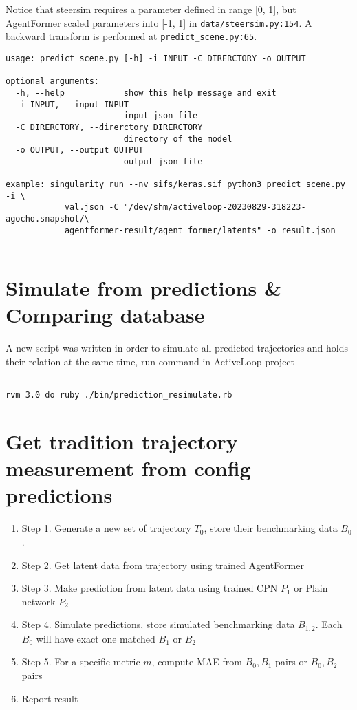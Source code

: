Notice that steersim requires a parameter defined in range [0, 1], but 
AgentFormer scaled parameters into [-1, 1] in \href{ 
https://github.com/hukaidong/MyAgentFormer/blob/e78cd3247d2a2691a5a8ca524b4c7b541fd2f55b/data/steersim.py#L154 
}{\texttt{data/steersim.py:154}}.  A backward transform is performed 
at \texttt{predict_scene.py:65}.

\begin{verbatim}
usage: predict_scene.py [-h] -i INPUT -C DIRERCTORY -o OUTPUT

optional arguments:
  -h, --help            show this help message and exit
  -i INPUT, --input INPUT
                        input json file
  -C DIRERCTORY, --direrctory DIRERCTORY
                        directory of the model
  -o OUTPUT, --output OUTPUT
                        output json file

example: singularity run --nv sifs/keras.sif python3 predict_scene.py -i \
            val.json -C "/dev/shm/activeloop-20230829-318223-agocho.snapshot/\
            agentformer-result/agent_former/latents" -o result.json
  
\end{verbatim}

\section{Simulate from predictions \& Comparing database}

A new script was written in order to simulate all predicted trajectories and 
holds their relation at the same time, run command in ActiveLoop project

\begin{verbatim}

rvm 3.0 do ruby ./bin/prediction_resimulate.rb

\end{verbatim}

\section{Get tradition trajectory measurement from config predictions}
\begin{enumerate}
  \item Step 1. Generate a new set of trajectory $T_0$, store their 
    benchmarking data $B_0$.
  \item Step 2. Get latent data from trajectory using trained AgentFormer
  \item Step 3. Make prediction from latent data using trained CPN $P_1$ or 
    Plain network $P_2$
  \item Step 4. Simulate predictions, store simulated benchmarking data $B_{1, 
    2}$. Each $B_0$ will have exact one matched $B_1$ or $B_2$
  \item Step 5. For a specific metric $m$, compute MAE from $B_0, B_1$ pairs or 
    $B_0, B_2$ pairs
  \item Report result
\end{enumerate}

